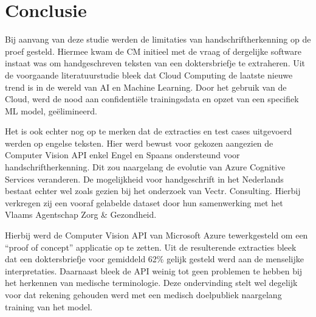 
\chapter{Conclusie}
\label{ch:conclusie}

Bij aanvang van deze studie werden de limitaties van handschriftherkenning op de proef gesteld. Hiermee kwam de CM initieel met de vraag of dergelijke software instaat was om handgeschreven teksten van een doktersbriefje te extraheren. Uit de voorgaande literatuurstudie bleek dat Cloud Computing de laatste nieuwe trend is in de wereld van AI en Machine Learning. Door het gebruik van de Cloud, werd de nood aan confidentiële trainingsdata en opzet van een specifiek ML model, geëlimineerd. 

Het is ook echter nog op te merken dat de extracties en test cases uitgevoerd werden op engelse teksten. Hier werd bewust voor gekozen aangezien de Computer Vision API enkel Engel en Spaans ondersteund voor handschriftherkenning. Dit zou naargelang de evolutie van Azure Cognitive Services veranderen. De mogelijkheid voor handgeschrift in het Nederlands bestaat echter wel zoals gezien bij het onderzoek van Vectr. Consulting. Hierbij verkregen zij een vooraf gelabelde dataset door hun samenwerking met het Vlaams Agentschap Zorg \& Gezondheid. 



Hierbij werd de Computer Vision API van Microsoft Azure tewerkgesteld om een “proof of concept” applicatie op te zetten. Uit de resulterende extracties bleek dat een doktersbriefje voor gemiddeld 62\% gelijk gesteld werd aan de menselijke interpretaties. Daarnaast bleek de API weinig tot geen problemen te hebben bij het herkennen van medische terminologie. Deze ondervinding stelt wel degelijk voor dat rekening gehouden werd met een medisch doelpubliek naargelang training van het model. 

